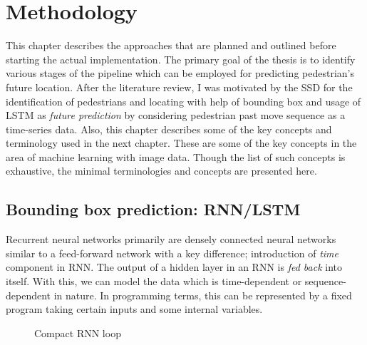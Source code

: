 
\chapter{Methodology}
This chapter describes the approaches that are planned and outlined before starting the actual implementation. The primary goal of the thesis is to identify various stages of the pipeline which can be employed for predicting pedestrian's future location. After the literature review, I was motivated by the SSD for the identification of pedestrians and locating with help of bounding box and usage of LSTM as \textit{future prediction} by considering pedestrian past move sequence as a time-series data. Also, this chapter describes some of the key concepts and terminology used in the next chapter. These are some of the key concepts in the area of machine learning with image data. Though the list of such concepts is exhaustive, the minimal terminologies and concepts are presented here.


\section{Bounding box prediction: RNN/LSTM}
Recurrent neural networks primarily are densely connected neural networks similar to a feed-forward network with a key difference; introduction of \textit{time} component in RNN. The output of a hidden layer in an RNN is \textit{fed back } into itself. With this, we can model the data which is time-dependent or sequence-dependent in nature. In programming terms, this can be represented by a fixed program taking certain inputs and some internal variables.

\begin{figure}[H]
\begin{center}
\caption{Compact RNN loop}
\end{center}
\end{figure}

